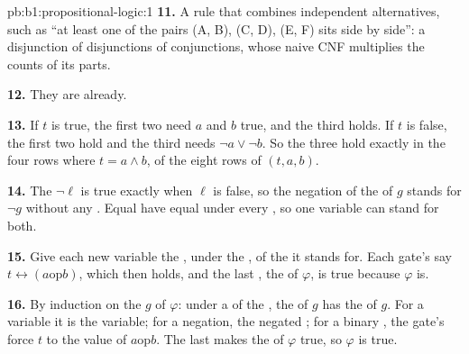\begin{solution}{pb:b1:propositional-logic:1}
\textbf{11.} A rule that combines independent alternatives, such as ``at least one of the pairs (A, B), (C, D), (E,
F) sits side by side'': a disjunction of disjunctions of conjunctions, whose naive CNF multiplies the counts of its
parts.

\textbf{12.} They are  already.

\textbf{13.} If $t$ is true, the first two  need $a$ and $b$ true, and the third holds. If $t$ is false, the
first two hold and the third needs $\neg a \vee \neg b$. So the three  hold exactly in the four rows where $t =
a \wedge b$, of the eight rows of $(t, a, b)$.

\textbf{14.} The  $\neg\ell$ is true exactly when $\ell$ is false, so the negation of the  of $g$ stands
for $\neg g$ without any . Equal  have equal  under every , so one variable can
stand for both.

\textbf{15.} Give each new variable the , under the , of the  it stands for. Each gate's
 say $t \leftrightarrow (a \mathbin{\mathrm{op}} b)$, which then holds, and the last , the  of
$\varphi$, is true because $\varphi$ is.

\textbf{16.} By induction on the  $g$ of $\varphi$: under a  of the , the  of $g$ has the
 of $g$. For a variable it is the variable; for a negation, the negated ; for a binary , the
gate's  force $t$ to the value of $a \mathbin{\mathrm{op}} b$. The last  makes the  of $\varphi$
true, so $\varphi$ is true.


\end{solution}
